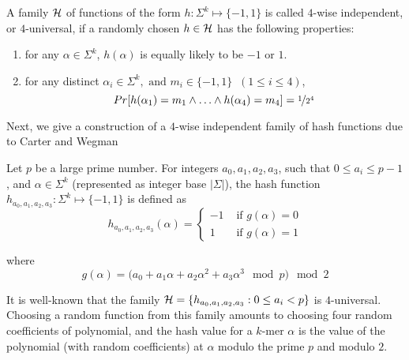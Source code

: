 \documentclass[runningheads]{llncs}
\begin{document}
\begin{definition}
A family ${\cal H}$ of functions of the form $h:\Sigma^k \mapsto
\{-1,1\}$ is called $4$-wise independent, or $4$-universal, if a
randomly chosen $h\in {\cal H}$ has the following properties:
\begin{enumerate} 
\item for any $\alpha\in \Sigma^k$, $h(\alpha)$ is equally likely to
  be $-1$ or $1$.
\item for any distinct $\alpha_i \in \Sigma^k, \text{ and } m_i \in
  \{-1,1\} \;\; (1\leq i \leq 4)$, $$ Pr[h(\alpha_1) = m_1 \wedge
    \ldots \wedge h(\alpha_4) = m_4] = \nicefrac{1}{2^4}$$
\end{enumerate}
\end{definition}

Next, we give a construction of a $4$-wise independent family of hash
functions due to Carter and Wegman~\cite{carter1977universal}



\begin{definition}
Let $p $ be a large prime number. For integers $a_0, a_1, a_2, a_3$,
such that $0\leq a_i \leq p-1$ , and $\alpha\in \Sigma^k$ (represented
as integer base $|\Sigma|$), the hash function $h_{a_0, a_1, a_2,
  a_3}: \Sigma^k \mapsto \{-1,1\}$ is defined
as \begin{equation}\label{eq_h_val} h_{a_0, a_1, a_2, a_3}(\alpha)
  = \begin{cases} -1 & \text{ if } g(\alpha) =0 \\ 1 & \text{ if }
    g(\alpha) =1 \end{cases}
\end{equation}

where  
\begin{equation}\label{eq_h_val_2}
    g(\alpha) =  \big(a_0 + a_1 \alpha + a_2\alpha^2 + a_3\alpha^3 \mod p \big) \mod 2
\end{equation}
\end{definition}

It is well-known that the family ${\cal H} = \{h_{a_0, a_1, a_2, a_3}:
0\leq a_i<p \}$ is $4$-universal. Choosing a random function from this
family amounts to choosing four random coefficients of
polynomial, and the hash value for a $k$-mer $\alpha$ is the value of
the polynomial (with random coefficients) at $\alpha$ modulo the prime
$p$ and modulo $2$.
\end{document}
